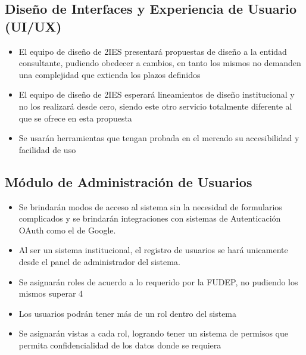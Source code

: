 \subsection{Diseño de Interfaces y Experiencia de Usuario (UI/UX)}
\begin{itemize}
    \item El equipo de diseño de 2IES presentará propuestas de diseño a la entidad consultante, pudiendo obedecer a cambios, en tanto los mismos no demanden una complejidad que extienda los plazos definidos
    \item El equipo de diseño de 2IES esperará lineamientos de diseño institucional y no los realizará desde cero, siendo este otro servicio totalmente diferente al que se ofrece en esta propuesta
    \item Se usarán herramientas que tengan probada en el mercado su accesibilidad y facilidad de uso
\end{itemize}

\subsection{Módulo de Administración de Usuarios}
\begin{itemize}
    \item Se brindarán modos de acceso al sistema sin la necesidad de formularios complicados y se brindarán integraciones con sistemas de Autenticación OAuth como el de Google.
    \item Al ser un sistema institucional, el registro de usuarios se hará unicamente desde el panel de administrador del sistema.
    \item Se asignarán roles de acuerdo a lo requerido por la FUDEP, no pudiendo los mismos superar 4 
    \item Los usuarios podrán tener más de un rol dentro del sistema
    \item Se asignarán vistas a cada rol, logrando tener un sistema de permisos que permita confidencialidad de los datos donde se requiera
\end{itemize}

